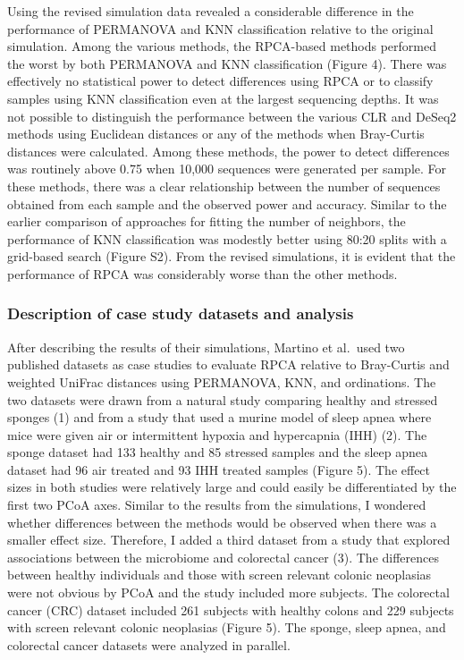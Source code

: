\documentclass[
  11pt,
]{article}
\begin{document}
Using the revised simulation data revealed a considerable difference in
the performance of PERMANOVA and KNN classification relative to the
original simulation. Among the various methods, the RPCA-based methods
performed the worst by both PERMANOVA and KNN classification (Figure 4).
There was effectively no statistical power to detect differences using
RPCA or to classify samples using KNN classification even at the largest
sequencing depths. It was not possible to distinguish the performance
between the various CLR and DeSeq2 methods using Euclidean distances or
any of the methods when Bray-Curtis distances were calculated. Among
these methods, the power to detect differences was routinely above 0.75
when 10,000 sequences were generated per sample. For these methods,
there was a clear relationship between the number of sequences obtained
from each sample and the observed power and accuracy. Similar to the
earlier comparison of approaches for fitting the number of neighbors,
the performance of KNN classification was modestly better using 80:20
splits with a grid-based search (Figure S2). From the revised
simulations, it is evident that the performance of RPCA was considerably
worse than the other methods.

\subsubsection{Description of case study datasets and
analysis}\label{description-of-case-study-datasets-and-analysis}

After describing the results of their simulations, Martino et al.~used
two published datasets as case studies to evaluate RPCA relative to
Bray-Curtis and weighted UniFrac distances using PERMANOVA, KNN, and
ordinations. The two datasets were drawn from a natural study comparing
healthy and stressed sponges (1) and from a study that used a murine
model of sleep apnea where mice were given air or intermittent hypoxia
and hypercapnia (IHH) (2). The sponge dataset had 133 healthy and 85
stressed samples and the sleep apnea dataset had 96 air treated and 93
IHH treated samples (Figure 5). The effect sizes in both studies were
relatively large and could easily be differentiated by the first two
PCoA axes. Similar to the results from the simulations, I wondered
whether differences between the methods would be observed when there was
a smaller effect size. Therefore, I added a third dataset from a study
that explored associations between the microbiome and colorectal cancer
(3). The differences between healthy individuals and those with screen
relevant colonic neoplasias were not obvious by PCoA and the study
included more subjects. The colorectal cancer (CRC) dataset included 261
subjects with healthy colons and 229 subjects with screen relevant
colonic neoplasias (Figure 5). The sponge, sleep apnea, and colorectal
cancer datasets were analyzed in parallel.
\end{document}
